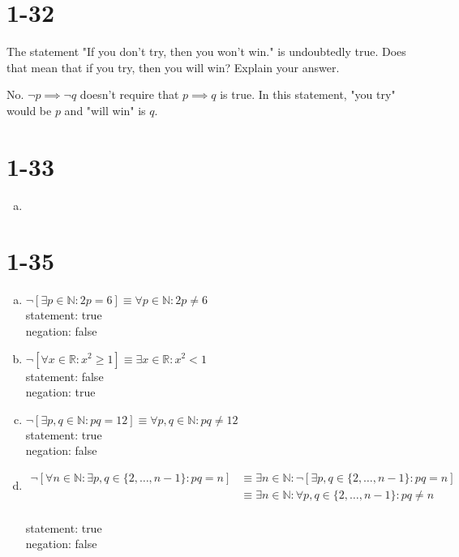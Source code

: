 \documentclass{article}
\newcommand{\N}{\mathbb{N}}
\newcommand{\R}{\mathbb{R}}
\begin{document}
\section{1-32}

The statement "If you don't try, then you won't win." is undoubtedly true.  Does
that mean that if you try, then you will win? Explain your answer.

No. $\neg p \implies \neg q$ doesn't require that $p \implies q$ is true.  In
this statement, "you try" would be $p$ and "will win" is $q$.


\section{1-33}

\begin{enumerate}[a)]
    \item
\end{enumerate}

\section{1-35}

\begin{enumerate}[a)]
    \item $\neg\left[\exists p \in \N : 2p = 6\right] \equiv \forall p
        \in \N : 2p \neq 6$ \\
        statement: true \\
        negation: false \\
    \item $\neg\left[\forall x \in \R : x^2 \geq 1 \right] \equiv 
        \exists x \in \R : x^2 < 1$ \\
        statement: false \\
        negation: true \\
    \item $\neg\left[\exists p, q \in \N : pq = 12 \right] \equiv 
        \forall p,q \in \N : pq \neq 12$ \\
        statement: true \\
        negation: false \\
    \item \begin{align*}
            \neg\left[\forall n \in \N : \exists p,q \in \{2, \dots, n - 1\} : pq = n\right]
        &\equiv \exists n \in \N : \neg \left[\exists p,q \in \{2, \dots, n - 1\} : pq = n\right] \\
        &\equiv \exists n \in \N : \forall p,q \in \{2,\dots, n-1\} : pq \neq n
        \end{align*} \\
        statement: true \\
        negation: false \\
\end{enumerate}
\end{document}
